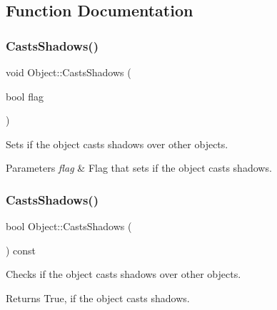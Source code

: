 \subsection{Function Documentation}
\hypertarget{group___geometric_objects_ga74fa63e74026915a261117724303adfc}{}\label{group___geometric_objects_ga74fa63e74026915a261117724303adfc} 
\subsubsection{\texorpdfstring{Casts\+Shadows()}{CastsShadows()}\hspace{0.1cm}{\footnotesize\ttfamily [1/2]}}
{\footnotesize\ttfamily void Object\+::\+Casts\+Shadows (\begin{DoxyParamCaption}\item[{bool}]{flag }\end{DoxyParamCaption})\hspace{0.3cm}{\ttfamily [inline]}}

Sets if the object casts shadows over other objects. 
\begin{DoxyParams}{Parameters}
{\em flag} & Flag that sets if the object casts shadows. \\
\hline
\end{DoxyParams}
\hypertarget{group___geometric_objects_gab4254fb85f166245bb7234f5c5295777}{}\label{group___geometric_objects_gab4254fb85f166245bb7234f5c5295777} 
\subsubsection{\texorpdfstring{Casts\+Shadows()}{CastsShadows()}\hspace{0.1cm}{\footnotesize\ttfamily [2/2]}}
{\footnotesize\ttfamily bool Object\+::\+Casts\+Shadows (\begin{DoxyParamCaption}{ }\end{DoxyParamCaption}) const\hspace{0.3cm}{\ttfamily [inline]}}

Checks if the object casts shadows over other objects. \begin{DoxyReturn}{Returns}
True, if the object casts shadows. 
\end{DoxyReturn}
\hypertarget{group___geometric_objects_ga7ad7172879f1b2fd092561827aa2bbb1}{}\label{group___geometric_objects_ga7ad7172879f1b2fd092561827aa2bbb1} 
